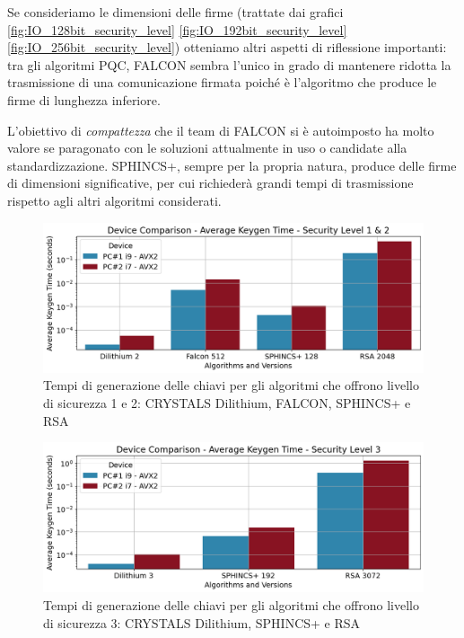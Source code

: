 Se consideriamo le dimensioni delle firme (trattate dai grafici \ref{fig:IO_128bit_security_level} \ref{fig:IO_192bit_security_level} \ref{fig:IO_256bit_security_level}) otteniamo altri aspetti di riflessione importanti: tra gli algoritmi PQC, FALCON sembra l'unico in grado di mantenere ridotta la trasmissione di una comunicazione firmata poiché è l'algoritmo che produce le firme di lunghezza inferiore.

L'obiettivo di \textit{compattezza} che il team di FALCON si è autoimposto ha molto valore se paragonato con le soluzioni attualmente in uso o candidate alla standardizzazione. SPHINCS+, sempre per la propria natura, produce delle firme di dimensioni significative, per cui richiederà grandi tempi di trasmissione rispetto agli altri algoritmi considerati.

\begin{figure}[H]
    \centering
    \includegraphics[width=1\textwidth]{Immagini/comparison/Time_Keygen/TM_KG_128bit_security_level.png}
    \caption{Tempi di generazione delle chiavi per gli algoritmi che offrono livello di sicurezza 1 e 2: CRYSTALS Dilithium, FALCON, SPHINCS+ e RSA}
    \label{fig:TM_KG_128bit_security_level}
\end{figure}

\begin{figure}[H]
    \centering
    \includegraphics[width=1\textwidth]{Immagini/comparison/Time_Keygen/TM_KG_192bit_security_level.png}
    \caption{Tempi di generazione delle chiavi per gli algoritmi che offrono livello di sicurezza 3: CRYSTALS Dilithium, SPHINCS+ e RSA}
    \label{fig:TM_KG_192bit_security_level}
\end{figure}

